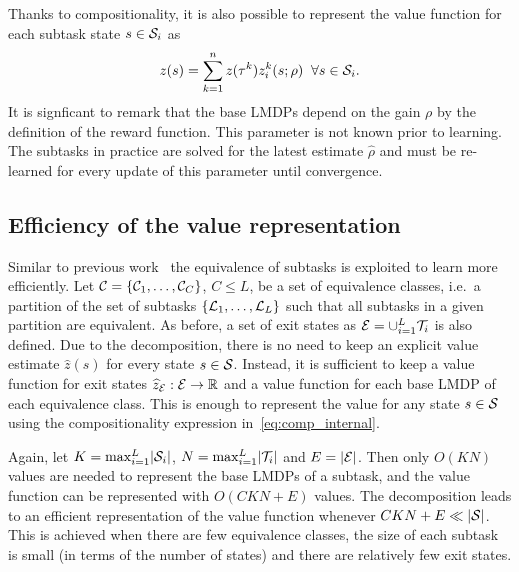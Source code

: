 Thanks to compositionality, it is also possible to represent the value function for each subtask state $s\in\mathcal{S}_i$ as
\begin{equation}
  z(s) = \sum_{k=1}^n z(\tau^k) z_i^k(s;\rho)\;\;\forall s\in\mathcal{S}_i.
  \label{eq:comp_internal}
\end{equation}
It is signficant to remark that the base LMDPs depend on the gain $\rho$ by the definition of the reward function. This parameter is not known prior to learning. The subtasks in practice are solved for the latest estimate $\widehat\rho$ and must be re-learned for every update of this parameter until convergence.
\subsection{Efficiency of the value representation}
 Similar to previous work~\citep{Wen2020,Infante2022} the equivalence of subtasks is exploited to learn more efficiently. Let $\mathcal{C}=\{\mathcal{C}_1,\ldots,\mathcal{C}_C\}$, $C\leq L$, be a set of equivalence classes, i.e.~a partition of the set of subtasks $\{\mathcal{L}_1,\ldots,\mathcal{L}_L\}$ such that all subtasks in a given partition are equivalent.
As before, a set of exit states as $\mathcal{E}=\cup_{i=1}^L\mathcal{T}_i$ is also defined.
Due to the decomposition, there is no need to keep an explicit value estimate $\widehat z(s)$ for every state $s\in\mathcal{S}$. Instead, it is sufficient to keep a value function for exit states $\widehat z_{\mathcal{E}}: \mathcal{E}\rightarrow\mathbb{R}$ and a value function for each base LMDP of each equivalence class. This is enough to represent the value for any state $s\in\mathcal{S}$ using the compositionality expression in~\eqref{eq:comp_internal}.

Again, let $K=\max_{i=1} ^L\lvert\mathcal{S}_i\rvert$,  $N=\max_{i=1} ^L\lvert\mathcal{T}_i\rvert$ and $E=\lvert\mathcal{E}\rvert$. Then only $O(KN)$ values are needed to represent the base LMDPs of a subtask, and the value function can be represented with $O(CKN + E)$ values. The decomposition leads to an efficient representation of the value function whenever $CKN + E \ll \lvert\mathcal{S}\rvert$. This is achieved when there are few equivalence classes, the size of each subtask is small (in terms of the number of states) and there are relatively few exit states.



